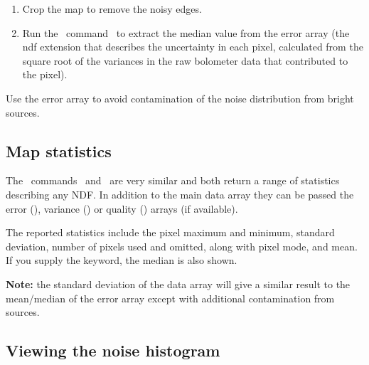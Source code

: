 \begin{enumerate}
\item Crop the map to remove the noisy edges.

\begin{terminalv}
\end{terminalv}

\item Run the \Kappa\ command \stats\ to extract the median value from
the error array (the ndf extension that describes the uncertainty in each pixel,
calculated from the square root of the variances in the raw bolometer data
that contributed to the pixel).

\begin{terminalv}
\end{terminalv}

\end{enumerate}

\begin{tip}
  Use the error array to avoid contamination of the noise distribution
  from bright sources.
\end{tip}


\subsection{Map statistics}

The \Kappa\ commands \histat\ and \stats\ are very similar and both
return a range of statistics describing any NDF. In addition to the
main data array they can be passed the error (), variance
() or quality () arrays (if available).

The reported statistics include the pixel maximum and minimum,
standard deviation, number of pixels used and omitted, along with
pixel mode, and mean.  If you supply the  keyword,
the median is also shown.

\begin{terminalv}
\end{terminalv}

\textbf{Note:} the standard deviation of the data array will give a
similar result to the mean/median of the error array except with
additional contamination from sources.



\subsection{Viewing the noise histogram}

